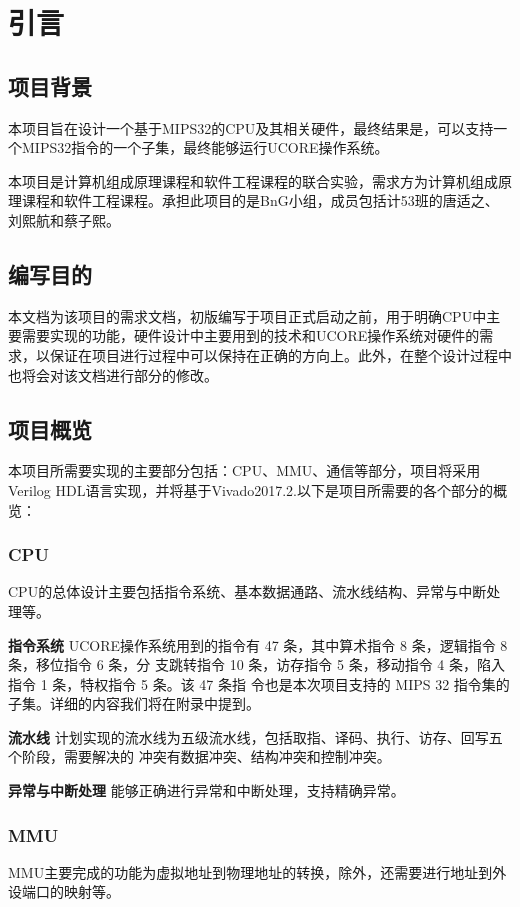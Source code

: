 \documentclass[11pt,utf8]{article}
\begin{document}
\section{引言}
\subsection{项目背景}
本项目旨在设计一个基于MIPS32的CPU及其相关硬件，最终结果是，可以支持一个MIPS32指令的一个子集，最终能够运行UCORE操作系统。

本项目是计算机组成原理课程和软件工程课程的联合实验，需求方为计算机组成原理课程和软件工程课程。承担此项目的是BnG小组，成员包括计53班的唐适之、刘熙航和蔡子熙。

\subsection{编写目的}
本文档为该项目的需求文档，初版编写于项目正式启动之前，用于明确CPU中主要需要实现的功能，硬件设计中主要用到的技术和UCORE操作系统对硬件的需求，以保证在项目进行过程中可以保持在正确的方向上。此外，在整个设计过程中也将会对该文档进行部分的修改。

\subsection{项目概览}
本项目所需要实现的主要部分包括：CPU、MMU、通信等部分，项目将采用Verilog HDL语言实现，并将基于Vivado2017.2.以下是项目所需要的各个部分的概览：

\subsubsection{CPU}
CPU的总体设计主要包括指令系统、基本数据通路、流水线结构、异常与中断处理等。

\textbf{指令系统} UCORE操作系统用到的指令有 47 条，其中算术指令 8 条，逻辑指令 8 条，移位指令 6 条，分 支跳转指令 10 条，访存指令 5 条，移动指令 4 条，陷入指令 1 条，特权指令 5 条。该 47 条指 令也是本次项目支持的 MIPS 32 指令集的子集。详细的内容我们将在附录中提到。

\textbf{流水线} 计划实现的流水线为五级流水线，包括取指、译码、执行、访存、回写五个阶段，需要解决的 冲突有数据冲突、结构冲突和控制冲突。

\textbf{异常与中断处理} 能够正确进行异常和中断处理，支持精确异常。

\subsubsection{MMU}
MMU主要完成的功能为虚拟地址到物理地址的转换，除外，还需要进行地址到外设端口的映射等。
\end{document}
